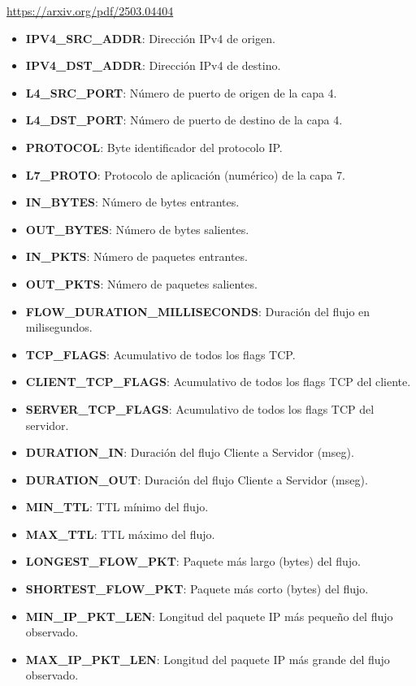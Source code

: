 \url{https://arxiv.org/pdf/2503.04404}

\begin{itemize}
    \item \textbf{IPV4\_SRC\_ADDR}: Dirección IPv4 de origen.
    \item \textbf{IPV4\_DST\_ADDR}: Dirección IPv4 de destino.
    \item \textbf{L4\_SRC\_PORT}: Número de puerto de origen de la capa 4.
    \item \textbf{L4\_DST\_PORT}: Número de puerto de destino de la capa 4.
    \item \textbf{PROTOCOL}: Byte identificador del protocolo IP.
    \item \textbf{L7\_PROTO}: Protocolo de aplicación (numérico) de la capa 7.
    \item \textbf{IN\_BYTES}: Número de bytes entrantes.
    \item \textbf{OUT\_BYTES}: Número de bytes salientes.
    \item \textbf{IN\_PKTS}: Número de paquetes entrantes.
    \item \textbf{OUT\_PKTS}: Número de paquetes salientes.
    \item \textbf{FLOW\_DURATION\_MILLISECONDS}: Duración del flujo en milisegundos.
    \item \textbf{TCP\_FLAGS}: Acumulativo de todos los flags TCP.
    \item \textbf{CLIENT\_TCP\_FLAGS}: Acumulativo de todos los flags TCP del cliente.
    \item \textbf{SERVER\_TCP\_FLAGS}: Acumulativo de todos los flags TCP del servidor.
    \item \textbf{DURATION\_IN}: Duración del flujo Cliente a Servidor (mseg).
    \item \textbf{DURATION\_OUT}: Duración del flujo Cliente a Servidor (mseg).
    \item \textbf{MIN\_TTL}: TTL mínimo del flujo.
    \item \textbf{MAX\_TTL}: TTL máximo del flujo.
    \item \textbf{LONGEST\_FLOW\_PKT}: Paquete más largo (bytes) del flujo.
    \item \textbf{SHORTEST\_FLOW\_PKT}: Paquete más corto (bytes) del flujo.
    \item \textbf{MIN\_IP\_PKT\_LEN}: Longitud del paquete IP más pequeño del flujo observado.
    \item \textbf{MAX\_IP\_PKT\_LEN}: Longitud del paquete IP más grande del flujo observado.

\end{itemize}
